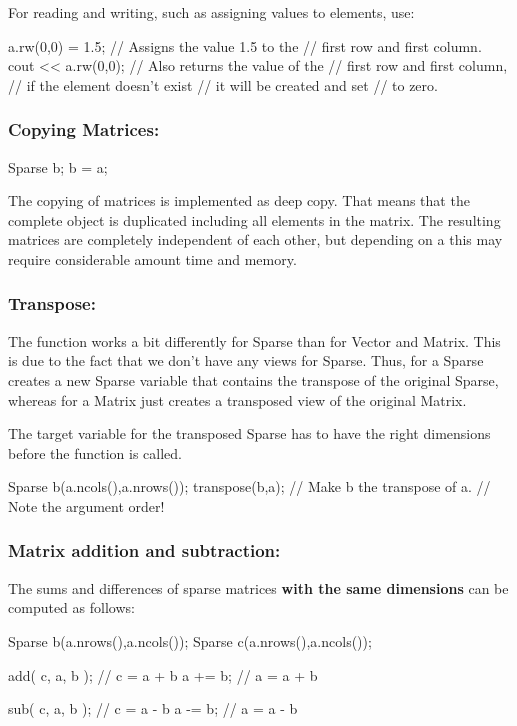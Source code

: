 For reading and writing, such as assigning values to elements, use:
\begin{code}
a.rw(0,0) = 1.5;    // Assigns the value 1.5 to the
                    // first row and first column.
cout << a.rw(0,0);  // Also returns the value of the
                    // first row and first column,
                    // if the element doesn't exist
                    // it will be created and set
                    // to zero.
\end{code}

\subsubsection{Copying Matrices:}
\begin{code}
Sparse b;
b = a;
\end{code}
%
The copying of matrices is implemented as deep copy. That means that the complete
object is duplicated including all elements in the matrix. The resulting matrices
are completely independent of each other, but depending on a this may require
considerable amount time and memory.

\subsubsection{Transpose:} The function  works a bit
differently for Sparse than for Vector and Matrix. This is due to the
fact that we don't have any views for Sparse. Thus,
 for a Sparse creates a new Sparse variable that
contains the transpose of the original Sparse, whereas
 for a Matrix just creates a transposed view of
the original Matrix.

The target variable for the transposed Sparse has to have the right
dimensions before the function is called.
\begin{code}
Sparse b(a.ncols(),a.nrows());
transpose(b,a);     // Make b the transpose of a.
                    // Note the argument order!
\end{code}

\subsubsection{Matrix addition and subtraction:}

The sums and differences of sparse matrices \textbf{with the same
dimensions} can be computed as follows:
%
\begin{code}
Sparse b(a.nrows(),a.ncols());
Sparse c(a.nrows(),a.ncols());

add( c, a, b ); // c = a + b
a += b;       // a = a + b

sub( c, a, b ); // c = a - b
a -= b;       // a = a - b
\end{code}
%

